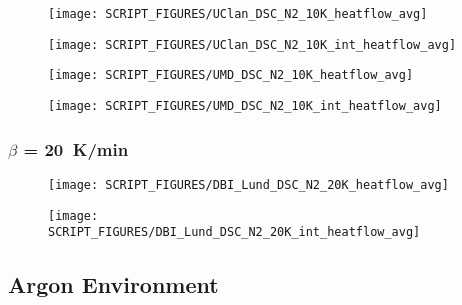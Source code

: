 \begin{landscape}
\begin{minipage}{0.65\textwidth}
\begin{figure}[H]
{\texttt{[image: SCRIPT\_FIGURES/UClan\_DSC\_N2\_10K\_heatflow\_avg]}}\\
\end{figure}
\end{minipage}
\begin{minipage}{0.35\textwidth}
\begin{figure}[H]
{\texttt{[image: SCRIPT\_FIGURES/UClan\_DSC\_N2\_10K\_int\_heatflow\_avg]}}\\
\end{figure}
\end{minipage}

\begin{minipage}{0.65\textwidth}
\begin{figure}[H]
{\texttt{[image: SCRIPT\_FIGURES/UMD\_DSC\_N2\_10K\_heatflow\_avg]}}\\
\end{figure}
\end{minipage}
\begin{minipage}{0.35\textwidth}
\begin{figure}[H]
{\texttt{[image: SCRIPT\_FIGURES/UMD\_DSC\_N2\_10K\_int\_heatflow\_avg]}}\\
\end{figure}
\end{minipage}
\vfill

\newpage
\subsubsection{$\beta$ = 20~K/min}
\begin{minipage}{0.65\textwidth}
\begin{figure}[H]
{\texttt{[image: SCRIPT\_FIGURES/DBI\_Lund\_DSC\_N2\_20K\_heatflow\_avg]}}\\
\end{figure}
\end{minipage} 
\begin{minipage}{0.35\textwidth}
\begin{figure}[H]
{\texttt{[image: SCRIPT\_FIGURES/DBI\_Lund\_DSC\_N2\_20K\_int\_heatflow\_avg]}}\\
\end{figure}
\end{minipage}
\vfill

\newpage
\subsection{Argon Environment}
\label{DSC_Ar}

\end{landscape}
